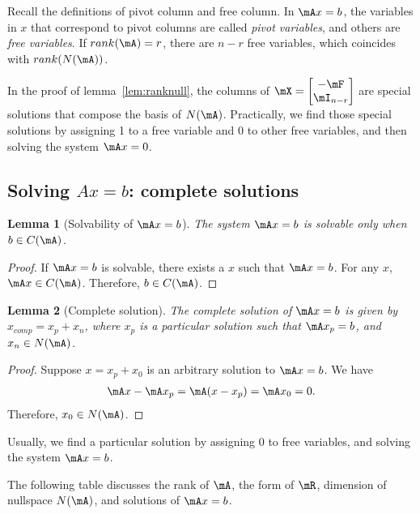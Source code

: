 \documentclass[11pt]{article}
\theoremstyle{plain}
\newtheorem{lem}{Lemma}
\theoremstyle{definition}
\begin{document}
Recall the definitions of pivot column and free column. In $\mA x = b$, the variables in $x$ that correspond to pivot columns are called \textit{pivot variables}, and others are \textit{free variables}. If $rank(\mA) = r$, there are $n-r$ free variables, which coincides with $rank(N(\mA))$. 

In the proof of lemma~\ref{lem:ranknull}, the columns of $\mX = \begin{bmatrix} -\mF \\ \mI_{n-r}	\end{bmatrix}$ are special solutions that compose the basis of $N(\mA)$. Practically, we find those special solutions by assigning 1 to a free variable and 0 to other free variables, and then solving the system $\mA x = 0$. 



\subsection{Solving $Ax = b$: complete solutions}

\begin{lem}[Solvability of $\mA x = b$]\label{lem:solve} The system $\mA x = b$ is solvable only when $b \in C(\mA)$.	
\end{lem}

\begin{proof}
	 If $\mA x = b$ is solvable, there exists a $x$ such that $\mA x = b$. For any $x$, $\mA x \in C(\mA)$. Therefore, $b \in C(\mA)$.
\end{proof}

\begin{lem}[Complete solution]\label{lem:compsolu} The complete solution of $\mA x = b$ is given by $x_{comp} = x_p + x_n$, where $x_p$ is a particular solution such that $\mA x_p = b$, and $x_n \in N(\mA)$. 
\end{lem}

\begin{proof}
	Suppose $x = x_p + x_0$ is an arbitrary solution to $\mA x= b$. We have 
	\begin{align}
		\mA x - \mA x_p = \mA (x- x_p) = \mA x_0 = 0.
	\end{align}
	Therefore, $x_0 \in N(\mA)$.
\end{proof}

Usually, we find a particular solution by assigning 0 to free variables, and solving the system $\mA x = b$. 

\vspace{.2cm}
The following table discusses the rank of $\mA$, the form of $\mR$, dimension of nullspace $N(\mA)$, and solutions of $\mA x = b$.
\end{document}
